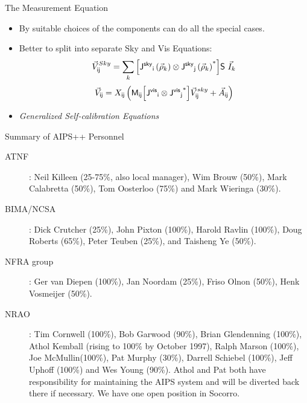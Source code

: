 \begin{slide}{The Measurement Equation}
\begin{itemize}
\begin{itemize}
\item Evaluate predicted coherences $\vvCoh\ssIJ$ if given all terms on right 
hand side,
\item Given observed coherences, construct an image of the Sky Brightness,
\item Solve for other terms on right hand side given observed coherences and
a model for the sky brightness.
\end{itemize}
\item By suitable choices of the components can do all the special
cases.
\item Better to split into separate Sky and Vis Equations:
\begin{equation}
{\vec{V}}^{Sky}_{{\sf i}{\sf j}} = \sum_k {\left[{{\sf J^{sky}}_{{\sf i}}\left({\vec{\rho}}_k\right)}\otimes{{\sf J^{sky}}_{{\sf j}}\left({\vec{\rho}}_k\right)}^\ast\right]} {\sf S} \ {\vec{I}}_k 
\end{equation}
\begin{equation}
{\vec{V}}_{{\sf i}{\sf j}} = {{X}}_{{\sf i}{\sf j}} \left({\sf M}_{{\sf i}{\sf j}} {\left[{{\sf J^{vis}}_{{\sf i}}}\otimes{{\sf J^{vis}}_{{\sf j}}}^\ast\right]} 
{\vec{V}}^{sky}_{{\sf i}{\sf j}} + {\vec{A}}_{{\sf i}{\sf j}} \right)
\end{equation}
\item {\em Generalized Self-calibration Equations}
\end{itemize}
\end{slide}


\begin{slide}{Summary of AIPS++ Personnel}

\begin{description}
\item[ATNF]: Neil Killeen (25-75\%, also local manager), Wim
Brouw (50\%), Mark Calabretta (50\%), Tom Oosterloo (75\%) and Mark
Wieringa (30\%).

\item[BIMA/NCSA]: Dick Crutcher (25\%), John Pixton (100\%),
Harold Ravlin (100\%), Doug Roberts (65\%), Peter Teuben (25\%), and
Taisheng Ye (50\%).  

\item[NFRA group]: Ger van Diepen (100\%), Jan Noordam (25\%), 
Friso Olnon (50\%), Henk Vosmeijer (50\%).

\item[NRAO]: Tim Cornwell (100\%), Bob Garwood (90\%), Brian
Glendenning (100\%), Athol Kemball (rising to 100\% by
October 1997), Ralph Marson (100\%), Joe McMullin(100\%), Pat Murphy
(30\%), Darrell Schiebel (100\%), Jeff Uphoff (100\%) and Wes Young
(90\%). Athol and Pat both have responsibility for maintaining the
AIPS system and will be diverted back there if necessary. We have one
open position in Socorro.

\end{description}
\end{slide}

% 
